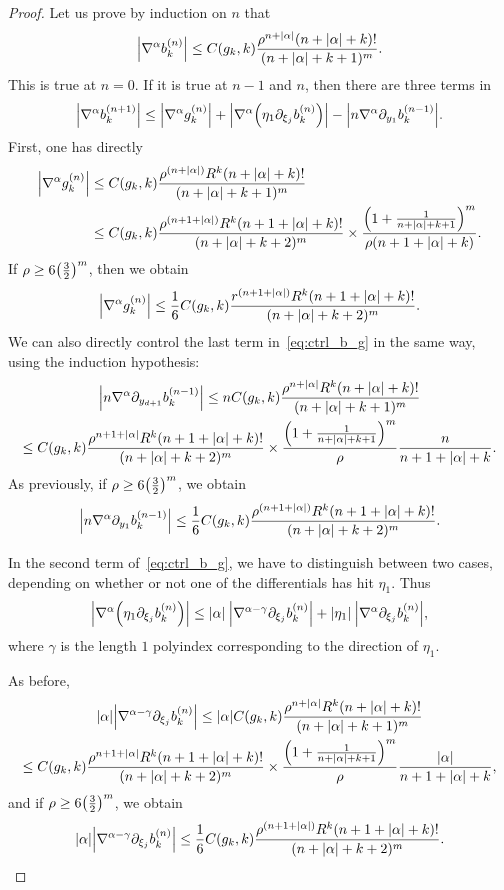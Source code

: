 \documentclass[10pt]{amsart}
\theoremstyle{definition}\newtheorem{defi}[theo]{Definition}\newtheorem{rema}[theo]{Remark}\newtheorem{exam}[theo]{Example}\newtheorem{exem}[theo]{Example}\newtheorem{nota}[theo]{Notation}
\newcommand\1{\mathds{1}}
\let\originalleft\left
\let\originalright\right
\renewcommand{\left}{\mathopen{}\mathclose\bgroup\originalleft}
\renewcommand{\right}{\aftergroup\egroup\originalright}
\begin{document}
\begin{proof}
Let us prove by induction on $n$ that
\[
\left|\nabla^{\alpha}b_k^{(n)}\right|\leq C(g_k,k)\frac{\rho^{n+|\alpha|}(n+|\alpha|+k)!}{(n+|\alpha|+k+1)^m}.
\]
This is true at $n=0$. If it is true at $n-1$ and $n$, then there are three terms in
\begin{equation}\label{eq:ctrl_b_g}
\left|\nabla^{\alpha}b_k^{(n+1)}\right|\leq\left|\nabla^{\alpha}g_k^{(n)}\right|+\left|\nabla^{\alpha}\left(\eta_{1}\partial_{\xi_j}b_k^{(n)}\right)\right|-
\left|n\nabla^{\alpha}\partial_{y_{1}}b_k^{(n-1)}\right|.
\end{equation}
First, one has directly
\begin{align*}
\left|\nabla^{\alpha}g_k^{(n)}\right|
&\leq C(g_k,k)\frac{\rho^{(n+|\alpha|)}R^k(n+|\alpha|+k)!}{(n+|\alpha|+k+1)^m}\\
&\leq C(g_k,k)\frac{\rho^{(n+1+|\alpha|)}R^k(n+1+|\alpha|+k)!}{(n+|\alpha|+k+2)^m}\times
\frac{\left(1+\frac{1}{n+|\alpha|+k+1}\right)^m}{\rho(n+1+|\alpha|+k)}.
\end{align*}
If $\rho\geq 6\left(\frac{3}{2}\right)^m$, then we obtain
\[
\left|\nabla^{\alpha}g_k^{(n)}\right|\leq
\frac{1}{6}C(g_k,k)\frac{r^{(n+1+|\alpha|)}R^k(n+1+|\alpha|+k)!}{(n+|\alpha|+k+2)^m}.
\]
We can also directly control the last term in~\eqref{eq:ctrl_b_g} in the same way, using the induction hypothesis:
\begin{multline*}
\left|n\nabla^{\alpha}\partial_{y_{d+1}}b_k^{(n-1)}\right|\leq nC(g_k,k)\frac{\rho^{n+|\alpha|}R^k(n+|\alpha|+k)!}{(n+|\alpha|+k+1)^m}\\
\leq C(g_k,k)\frac{\rho^{n+1+|\alpha|}R^k(n+1+|\alpha|+k)!}{(n+|\alpha|+k+2)^m}\times
\frac{\left(1+\frac{1}{n+|\alpha|+k+1}\right)^m}{\rho}\frac{n}{n+1+|\alpha|+k}.
\end{multline*}
As previously, if $\rho\geq 6\left(\frac 32\right)^m$, we obtain
\[
\left|n\nabla^{\alpha}\partial_{y_{1}}b_k^{(n-1)}\right|\leq
\frac{1}{6}C(g_k,k)\frac{\rho^{(n+1+|\alpha|)}R^k(n+1+|\alpha|+k)!}{(n+|\alpha|+k+2)^m}.
\]

In the second term of~\eqref{eq:ctrl_b_g}, we have to distinguish between two cases, depending on whether or not one of the differentials has hit $\eta_1$. Thus
\[
\left|\nabla^{\alpha}\left(\eta_{1}\partial_{\xi_j}b_k^{(n)}
\right)\right|\leq |\alpha|\:\left|\nabla^{\alpha-\gamma}\partial_{\xi_j}b_k^{(n)}\right|+|\eta_{1}|\:\left|\nabla^{\alpha}\partial_{\xi_j}b_k^{(n)}\right|,
\]
where $\gamma$ is the length $1$ polyindex corresponding to the direction of $\eta_{1}$.

As before,
\begin{multline*}
|\alpha|\left|\nabla^{\alpha-\gamma}\partial_{\xi_j}b_k^{(n)}\right|\leq |\alpha|C(g_k,k)\frac{\rho^{n+|\alpha|}R^k(n+|\alpha|+k)!}{(n+|\alpha|+k+1)^m}\\
\leq C(g_k,k)\frac{\rho^{n+1+|\alpha|}R^k(n+1+|\alpha|+k)!}{(n+|\alpha|+k+2)^m}\times
\frac{\left(1+\frac{1}{n+|\alpha|+k+1}\right)^m}{\rho}\frac{|\alpha|}{n+1+|\alpha|+k},
\end{multline*}
and if $\rho\geq 6\left(\frac 32\right)^m$, we obtain
\[
|\alpha|\left|\nabla^{\alpha-\gamma}\partial_{\xi_j}b_k^{(n)}\right|\leq
\frac{1}{6}C(g_k,k)\frac{\rho^{(n+1+|\alpha|)}R^k(n+1+|\alpha|+k)!}{(n+|\alpha|+k+2)^m}.
\]


\end{proof}
\end{document}
